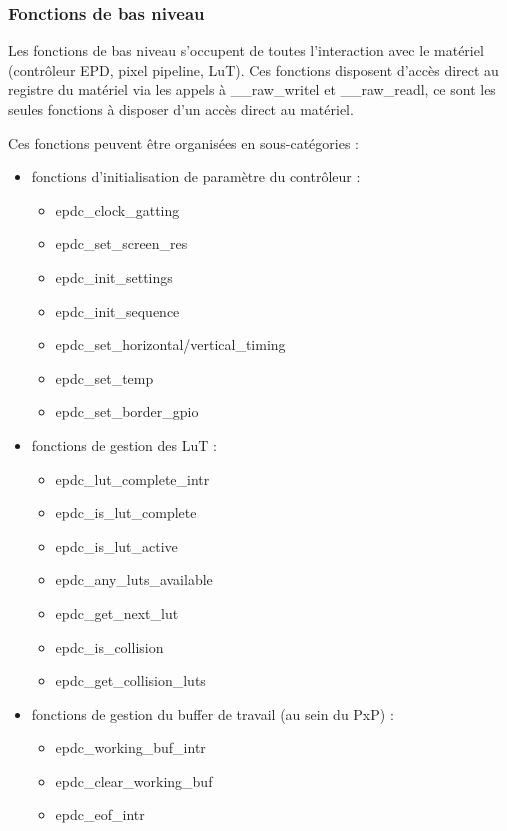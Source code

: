 \subsubsection{Fonctions de bas niveau}

Les fonctions de bas niveau s'occupent de toutes l'interaction avec le matériel (contrôleur EPD, pixel pipeline, LuT).
Ces fonctions disposent d'accès direct au registre du matériel via les appels à \_\_raw\_writel et \_\_raw\_readl, ce sont les seules fonctions à disposer d'un accès direct au matériel.


Ces fonctions peuvent être organisées en sous-catégories : 

\begin{itemize}
\renewcommand{\labelitemi}{$\bullet$}
	\item fonctions d'initialisation de paramètre du contrôleur : 
		\begin{itemize}
		\renewcommand{\labelitemi}{$\to$}
			\item epdc\_clock\_gatting
			\item epdc\_set\_screen\_res
			\item epdc\_init\_settings
			\item epdc\_init\_sequence
			\item epdc\_set\_horizontal/vertical\_timing
			\item epdc\_set\_temp
			\item epdc\_set\_border\_gpio
		\end{itemize}
	\item fonctions de gestion des LuT : 
		\begin{itemize}
			\item epdc\_lut\_complete\_intr
			\item epdc\_is\_lut\_complete
			\item epdc\_is\_lut\_active
			\item epdc\_any\_luts\_available
			\item epdc\_get\_next\_lut
			\item epdc\_is\_collision
			\item epdc\_get\_collision\_luts
		\end{itemize}
	\item fonctions de gestion du buffer de travail (au sein du PxP) : 
		\begin{itemize}
			\item epdc\_working\_buf\_intr
			\item epdc\_clear\_working\_buf
			\item epdc\_eof\_intr

\end{itemize}
\end{itemize}
